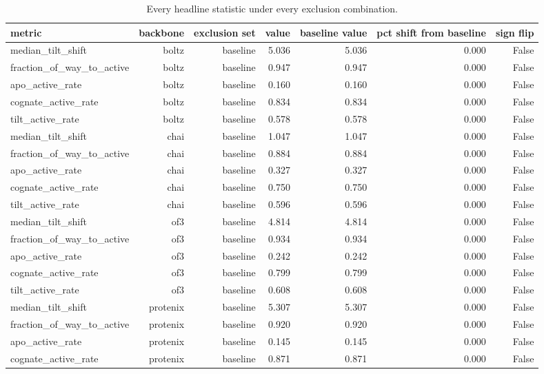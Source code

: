 \begin{table}[htbp]
\centering
\footnotesize
\caption{Every headline statistic under every exclusion combination.}
\label{tab:t5_exclusion_sweep}
\begin{tabular}{lrrrrrr}
\toprule
metric & backbone & exclusion set & value & baseline value & pct shift from baseline & sign flip \\
\midrule
median\_tilt\_shift & boltz & baseline & 5.036 & 5.036 & 0.000 & False \\
fraction\_of\_way\_to\_active & boltz & baseline & 0.947 & 0.947 & 0.000 & False \\
apo\_active\_rate & boltz & baseline & 0.160 & 0.160 & 0.000 & False \\
cognate\_active\_rate & boltz & baseline & 0.834 & 0.834 & 0.000 & False \\
tilt\_active\_rate & boltz & baseline & 0.578 & 0.578 & 0.000 & False \\
median\_tilt\_shift & chai & baseline & 1.047 & 1.047 & 0.000 & False \\
fraction\_of\_way\_to\_active & chai & baseline & 0.884 & 0.884 & 0.000 & False \\
apo\_active\_rate & chai & baseline & 0.327 & 0.327 & 0.000 & False \\
cognate\_active\_rate & chai & baseline & 0.750 & 0.750 & 0.000 & False \\
tilt\_active\_rate & chai & baseline & 0.596 & 0.596 & 0.000 & False \\
median\_tilt\_shift & of3 & baseline & 4.814 & 4.814 & 0.000 & False \\
fraction\_of\_way\_to\_active & of3 & baseline & 0.934 & 0.934 & 0.000 & False \\
apo\_active\_rate & of3 & baseline & 0.242 & 0.242 & 0.000 & False \\
cognate\_active\_rate & of3 & baseline & 0.799 & 0.799 & 0.000 & False \\
tilt\_active\_rate & of3 & baseline & 0.608 & 0.608 & 0.000 & False \\
median\_tilt\_shift & protenix & baseline & 5.307 & 5.307 & 0.000 & False \\
fraction\_of\_way\_to\_active & protenix & baseline & 0.920 & 0.920 & 0.000 & False \\
apo\_active\_rate & protenix & baseline & 0.145 & 0.145 & 0.000 & False \\
cognate\_active\_rate & protenix & baseline & 0.871 & 0.871 & 0.000 & False \\

\end{tabular}
\end{table}
